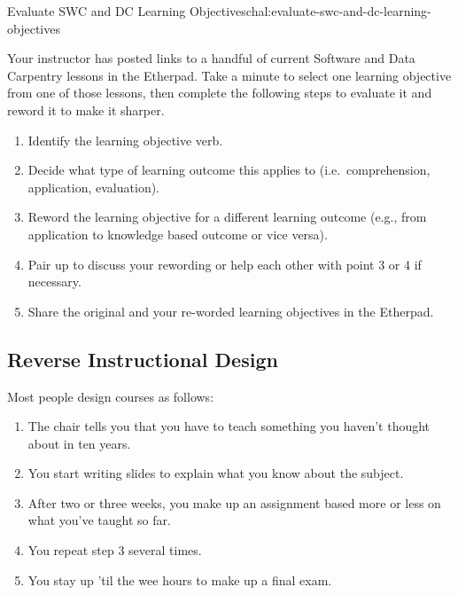 \begin{challenge}{Evaluate SWC and DC Learning Objectives}{chal:evaluate-swc-and-dc-learning-objectives}

Your instructor has posted links to a handful of current Software and
Data Carpentry lessons in the Etherpad. Take a minute to select one
learning objective from one of those lessons, then complete the
following steps to evaluate it and reword it to make it sharper.

\begin{enumerate}
\def\labelenumi{\arabic{enumi}.}
\itemsep1pt\parskip0pt
\item
  Identify the learning objective verb.
\item
  Decide what type of learning outcome this applies to
  (i.e.~comprehension, application, evaluation).
\item
  Reword the learning objective for a different learning outcome (e.g.,
  from application to knowledge based outcome or vice versa).
\item
  Pair up to discuss your rewording or help each other with point 3 or 4
  if necessary.
\item
  Share the original and your re-worded learning objectives in the Etherpad.
\end{enumerate}
\end{challenge}

\subsection{Reverse Instructional
Design}\label{reverse-instructional-design}

Most people design courses as follows:

\begin{enumerate}
\def\labelenumi{\arabic{enumi}.}
\itemsep1pt\parskip0pt
\item
  The chair tells you that you have to teach something you haven't
  thought about in ten years.
\item
  You start writing slides to explain what you know about the subject.
\item
  After two or three weeks, you make up an assignment based more or less
  on what you've taught so far.
\item
  You repeat step 3 several times.
\item
  You stay up 'til the wee hours to make up a final exam.
\end{enumerate}

